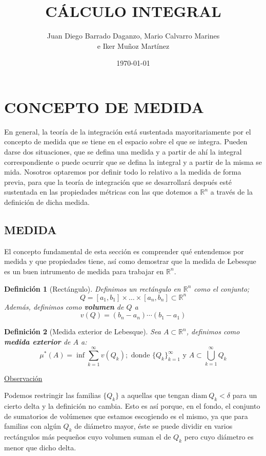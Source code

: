 \documentclass[10pt,a4paper,openright]{book}
\title{CÁLCULO INTEGRAL}
\author{Juan Diego Barrado Daganzo, Mario Calvarro Marines \\ e Iker Muñoz Martínez}
\date{\today}
\theoremstyle{break}
\newtheorem*{defi}{Definición}
\begin{document}
\maketitle
\chapter*{CONCEPTO DE MEDIDA}%
En general, la teoría de la integración está sustentada mayoritariamente por el concepto de medida que se tiene en el espacio sobre el que se integra. Pueden darse dos situaciones, que se defina una medida y a partir de ahí la integral correspondiente o puede ocurrir que se defina la integral y a partir de la misma se mida. Nosotros optaremos por definir todo lo relativo a la medida de forma previa, para que la teoría de integración que se desarrollará después esté sustentada en las propiedades métricas con las que dotemos a $\mathbb{R}^n$ a través de la definición de dicha medida.
\label{sec:medidas}
\section*{MEDIDA}%
El concepto fundamental de esta sección es comprender qué entendemos por medida y que propiedades tiene, así como demostrar que la medida de Lebesque es un buen intrumento de medida para trabajar en $\mathbb{R}^n$.

\label{sub:definicion_de_medida_exterior}

\begin{defi}[Rectángulo]
Definimos un rectángulo en $\mathbb{R}^n$ como el conjunto;
$$Q = \left[ a_1, b_1 \right] \times \ldots \times \left[ a_n, b_n \right] \subset \mathbb{R}^{n}$$
Además, definimos como \textbf{volumen} de $Q$ a 
$$v\left( Q \right) = \left( b_n - a_n \right) \cdots \left( b_1 - a_1 \right)$$
\end{defi}

\begin{defi}[Medida exterior de Lebesque]
Sea $A \subset \mathbb{R}^{n}$, definimos como \textbf{medida exterior} de $A$ a:
$$
\mu^{*}(A) = \inf \sum_{k=1}^{\infty} v\left( Q_k \right); \text{ donde } \{Q_k\}_{k=1}^{\infty} \text{ y } A \subset \bigcup_{k = 1}^{\infty} Q_k
$$ 
\end{defi}

\underline{Observación}

Podemos restringir las familias $\{Q_k\}$ a aquellas que tengan $\mathrm{diam}\ Q_k < \delta$ para un cierto delta y la definición no cambia. Esto es así porque, en el fondo, el conjunto de sumatorios de volúmenes que estamos escogiendo es el mismo, ya que para familias con algún $Q_k$ de diámetro mayor, éste se puede dividir en varios rectángulos más pequeños cuyo volumen suman el de $Q_k$ pero cuyo diámetro es menor que dicho delta.
\end{document}
